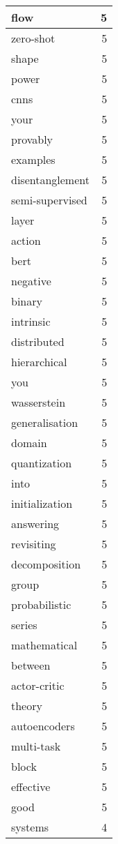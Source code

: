 \begin{table}[h]
\begin{tabular}{|l|r|}
\hline
flow & 5 \\
\hline
zero-shot & 5 \\
\hline
shape & 5 \\
\hline
power & 5 \\
\hline
cnns & 5 \\
\hline
your & 5 \\
\hline
provably & 5 \\
\hline
examples & 5 \\
\hline
disentanglement & 5 \\
\hline
semi-supervised & 5 \\
\hline
layer & 5 \\
\hline
action & 5 \\
\hline
bert & 5 \\
\hline
negative & 5 \\
\hline
binary & 5 \\
\hline
intrinsic & 5 \\
\hline
distributed & 5 \\
\hline
hierarchical & 5 \\
\hline
you & 5 \\
\hline
wasserstein & 5 \\
\hline
generalisation & 5 \\
\hline
domain & 5 \\
\hline
quantization & 5 \\
\hline
into & 5 \\
\hline
initialization & 5 \\
\hline
answering & 5 \\
\hline
revisiting & 5 \\
\hline
decomposition & 5 \\
\hline
group & 5 \\
\hline
probabilistic & 5 \\
\hline
series & 5 \\
\hline
mathematical & 5 \\
\hline
between & 5 \\
\hline
actor-critic & 5 \\
\hline
theory & 5 \\
\hline
autoencoders & 5 \\
\hline
multi-task & 5 \\
\hline
block & 5 \\
\hline
effective & 5 \\
\hline
good & 5 \\
\hline
systems & 4 \\
\hline

\end{tabular}
\end{table}
